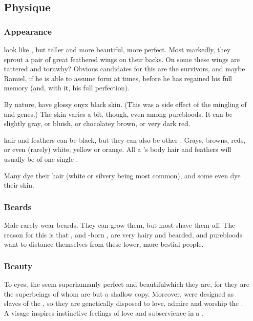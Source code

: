 \subsection{Physique}





\subsubsection{Appearance}
\Resphain{} look like \humans, but taller and more beautiful, more perfect. 
Most markedly, they sprout a pair of great feathered wings on their backs. 
On some \resphain{} these wings are tattered and torn\dash why? 
Obvious candidates for this are the \Kezeradi{} survivors, and maybe Ramiel, if he is able to assume \resphan{} form at times, before he has regained his full memory (and, with it, his full perfection). 

By nature, \resphain{} have glossy onyx black skin. 
(This was a side effect of the mingling of \SitraAchra and \nephilic{} genes.)
The skin \colour varies a bit, though, even among purebloods. 
It can be slightly gray, or bluish, or chocolatey brown, or very dark red.

\Resphan hair and feathers can be black, but they can also be other \colours: Grays, browns, reds, or even (rarely) white, yellow or orange.
All a \resphan's body hair and feathers will usually be of one single \colour.

Many dye their hair (white or silvery \colours being most common), and some even dye their skin. 





\subsubsection{Beards}
Male \resphain{} rarely wear beards. 
They can grow them, but most shave them off. 
The reason for this is that \nephilim{}, and \nephil-born , are very hairy and bearded, and purebloods want to distance themselves from these lower, more bestial people. 





\subsubsection{Beauty}
To \human{} eyes, the \resphain{} seem superhumanly perfect and beautiful\dash which they are, for they are the superbeings of whom \humans{} are but a shallow copy. 
Moreover, \humans{} were designed as slaves of the \resphain, so they are genetically disposed to love, admire and worship the \resphain. 
A \resphan{} visage inspires instinctive feelings of love and subservience in a \human. 

